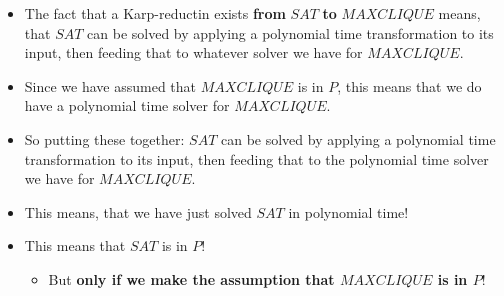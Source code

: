 \begin{itemize}
    \item The fact that a Karp-reductin exists \textbf{from} $SAT$  \textbf{to} $MAXCLIQUE$ means, that $SAT$ can be solved by applying a polynomial time transformation to its input, then feeding that to whatever solver we have for $MAXCLIQUE$.
    \item Since we have assumed that $MAXCLIQUE$ is in $P$, this means that we do have a polynomial time solver for $MAXCLIQUE$.
    \item So putting these together: $SAT$ can be solved by applying a polynomial time transformation to its input, then feeding that to the polynomial time solver we have for $MAXCLIQUE$.
    \item This means, that we have just solved $SAT$ in polynomial time!
    \item This means that $SAT$ is in $P$!
    \begin{itemize}
        \item But \textbf{only if we make the assumption that $MAXCLIQUE$ is in $P$}!
    \end{itemize}
\end{itemize}
